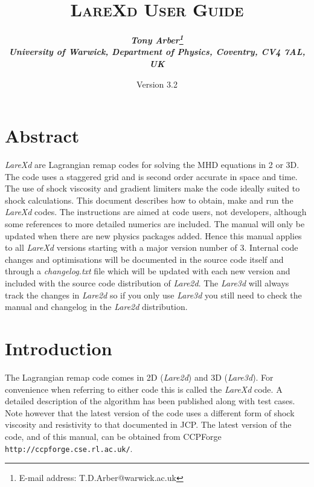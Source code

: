 \documentclass[11pt]{article}
\begin{document}
\title{
\bfseries\scshape LareXd User Guide}
\author{\bfseries\itshape Tony Arber\thanks{E-mail address: T.D.Arber@warwick.ac.uk}\\
University of Warwick, Department of Physics, Coventry, CV4 7AL, UK}
\date{Version 3.2}
\maketitle

\thispagestyle{empty}

\section*{Abstract}
{\it LareXd} are Lagrangian remap codes for solving the MHD equations in 2 or 3D. The code uses a staggered grid 
and is second order accurate in space and time. The use of shock viscosity and gradient limiters make the code 
ideally suited to shock calculations. This document describes how to obtain, make and run the {\it LareXd}  
codes. The instructions are aimed at code users, not developers, although some references to more detailed 
numerics are included. The manual will only be
updated when there are new physics packages added. Hence this manual applies to all {\it LareXd} versions 
starting with a major version number of 3. Internal code changes and optimisations will be documented in the 
source code itself and through a {\it changelog.txt} file which will be updated with each new version and 
included with the source code distribution of {\it Lare2d}. The {\it Lare3d} will always track the changes 
in {\it Lare2d} so if you only use {\it Lare3d} you still need to check the manual and changelog in the 
{\it Lare2d} distribution.


\section{Introduction}
The Lagrangian remap code comes in 2D ({\it Lare2d}) and 3D ({\it Lare3d}). For convenience when referring 
to either code this is called the {\it LareXd} code. A detailed description of the algorithm has been 
published \cite{jcp} along with test cases. Note however that the latest version of the code uses a 
different form of shock viscosity and resistivity to that documented in JCP. The latest version of the 
code, and of this manual, can be obtained from CCPForge {\tt http://ccpforge.cse.rl.ac.uk/}.
\end{document}
